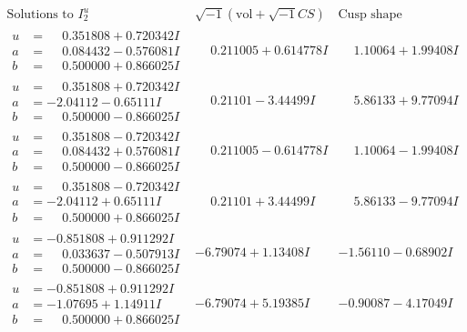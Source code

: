 \documentclass[1p]{elsarticle_modified}
\theoremstyle{definition}
\newcommand{\I}{\sqrt{-1}}
\begin{document}
$$\begin{array}{c|c|c}  
\text{Solutions to }I^u_{2}& \I (\text{vol} + \sqrt{-1}CS) & \text{Cusp shape}\\
 \hline 
\begin{aligned}
u &= \phantom{-}0.351808 + 0.720342 I \\
a &= \phantom{-}0.084432 - 0.576081 I \\
b &= \phantom{-}0.500000 + 0.866025 I\end{aligned}
 & \phantom{-}0.211005 + 0.614778 I & \phantom{-}1.10064 + 1.99408 I \\ \hline\begin{aligned}
u &= \phantom{-}0.351808 + 0.720342 I \\
a &= -2.04112 - 0.65111 I \\
b &= \phantom{-}0.500000 - 0.866025 I\end{aligned}
 & \phantom{-}0.21101 - 3.44499 I & \phantom{-}5.86133 + 9.77094 I \\ \hline\begin{aligned}
u &= \phantom{-}0.351808 - 0.720342 I \\
a &= \phantom{-}0.084432 + 0.576081 I \\
b &= \phantom{-}0.500000 - 0.866025 I\end{aligned}
 & \phantom{-}0.211005 - 0.614778 I & \phantom{-}1.10064 - 1.99408 I \\ \hline\begin{aligned}
u &= \phantom{-}0.351808 - 0.720342 I \\
a &= -2.04112 + 0.65111 I \\
b &= \phantom{-}0.500000 + 0.866025 I\end{aligned}
 & \phantom{-}0.21101 + 3.44499 I & \phantom{-}5.86133 - 9.77094 I \\ \hline\begin{aligned}
u &= -0.851808 + 0.911292 I \\
a &= \phantom{-}0.033637 - 0.507913 I \\
b &= \phantom{-}0.500000 - 0.866025 I\end{aligned}
 & -6.79074 + 1.13408 I & -1.56110 - 0.68902 I \\ \hline\begin{aligned}
u &= -0.851808 + 0.911292 I \\
a &= -1.07695 + 1.14911 I \\
b &= \phantom{-}0.500000 + 0.866025 I\end{aligned}
 & -6.79074 + 5.19385 I & -0.90087 - 4.17049 I \\ \hline\begin{aligned}

\end{aligned}
\end{array}$$
\end{document}
